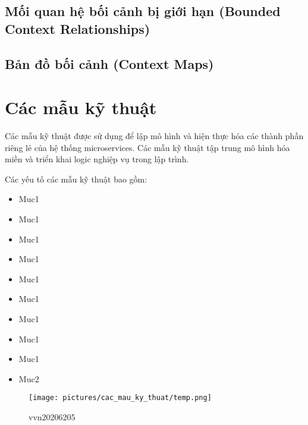 \subsection{Mối quan hệ bối cảnh bị giới hạn (Bounded Context Relationships)}
% 
\subsection{Bản đồ bối cảnh (Context Maps)}
% 
\section{Các mẫu kỹ thuật } \label{section:cac_mau_ky_thuat}

Các mẫu kỹ thuật được sử dụng để lập mô hình và hiện thực hóa các thành phần riêng lẻ của hệ thống microservices. Các mẫu kỹ thuật tập trung mô hình hóa miền và triển khai logic nghiệp vụ trong lập trình.

Các yếu tố các mẫu kỹ thuật bao gồm:

\begin{itemize}

    \item Muc1

    \item Muc1

    \item Muc1

    \item Muc1

    \item Muc1

    \item Muc1

    \item Muc1

    \item Muc1

    \item Muc1

    \item Muc2

\end{itemize}

\begin{figure}[H]

    \centering

    \texttt{[image: pictures/cac\_mau\_ky\_thuat/temp.png]}

    \caption{vvn20206205}

\end{figure}

